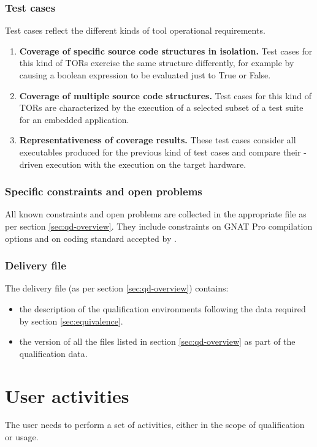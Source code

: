 \documentclass {report}
\begin{document}
\subsection{Test cases}
Test cases reflect the different kinds of tool operational requirements.
\begin{enumerate}

\item \textbf{Coverage of specific source code structures in isolation.} Test cases for this kind of TORs exercise the same structure differently, for example by causing a boolean expression to be evaluated just to True or False.

\item \textbf{Coverage of multiple source code structures.} Test cases for this kind of TORs are characterized by the execution of a selected subset of a test suite for an embedded application. 

\item \textbf{Representativeness of coverage results.} These test cases consider all executables produced for the previous kind of test cases and compare their \xcov-driven execution with the execution on the target hardware. 

\end{enumerate}

\subsection{Specific constraints and open problems}
\label{sec:constr-problems}
All known constraints and open problems are collected in the appropriate file as per section \ref{sec:qd-overview}. They include constraints on GNAT Pro compilation options and on coding standard accepted by \xcov.

\subsection{Delivery file}
\label{sec:delivery}
The delivery file (as per section \ref{sec:qd-overview}) contains:
\begin{itemize} 
\item the description of the qualification environments following the data required by section \ref{sec:equivalence}.
\item the version of all the files listed in section \ref{sec:qd-overview} as part of the qualification data.
\end{itemize}

\chapter{User activities}
\label{sec:user-act}
The user needs to perform a set of activities, either in the scope of \xcov qualification or \xcov usage.
\end{document}
